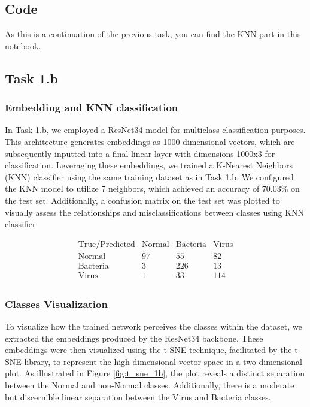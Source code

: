 \documentclass{article}
\begin{document}
\subsection{Code}

As this is a continuation of the previous task, you can find the KNN part in \href{https://www.kaggle.com/code/nitsanbh/lungs-x-ray#Question-2}{this notebook}.


\subsection{Task 1.b}

\subsubsection{Embedding and KNN classification}
In Task 1.b, we employed a ResNet34 model for multiclass classification purposes. This architecture generates embeddings as 1000-dimensional vectors, which are subsequently inputted into a final linear layer with dimensions 1000x3 for classification. Leveraging these embeddings, we trained a K-Nearest Neighbors (KNN) classifier using the same training dataset as in Task 1.b. We configured the KNN model to utilize 7 neighbors, which achieved an accuracy of 70.03\% on the test set. Additionally, a confusion matrix on the test set was plotted to visually assess the relationships and misclassifications between classes using KNN classifier.

\[
\begin{array}{c|cccc}
\text{True/Predicted} & \text{Normal} & \text{Bacteria} & \text{Virus} \\
\hline
\text{Normal} & 97 & 55 & 82 \\
\text{Bacteria} & 3 & 226 & 13 \\
\text{Virus} & 1 & 33 & 114 \\
\end{array}
\]

\subsubsection{Classes Visualization}
To visualize how the trained network perceives the classes within the dataset, we extracted the embeddings produced by the ResNet34 backbone. These embeddings were then visualized using the t-SNE technique, facilitated by the t-SNE library, to represent the high-dimensional vector space in a two-dimensional plot. As illustrated in Figure \ref{fig:t_sne_1b}, the plot reveals a distinct separation between the Normal and non-Normal classes. Additionally, there is a moderate but discernible linear separation between the Virus and Bacteria classes.
\end{document}
